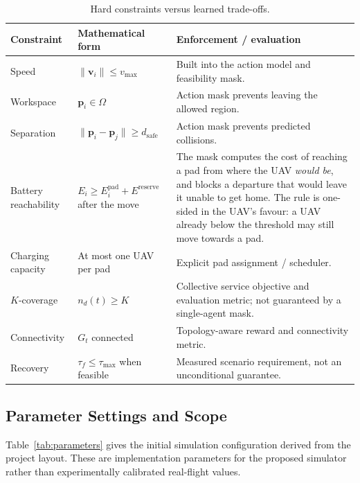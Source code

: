 \documentclass[conference]{IEEEtran}
\begin{document}
\begin{table}[t]
\caption{Hard constraints versus learned trade-offs.}
\label{tab:hardsoft}
\centering
\scriptsize
\renewcommand{\arraystretch}{1.06}
\begin{tabularx}{\columnwidth}{@{}L{1.38cm}L{2.05cm}Y@{}}
\toprule
Constraint & Mathematical form & Enforcement / evaluation \\
\midrule
Speed & $\|\mathbf v_i\|\le v_{\max}$ & Built into the action model and feasibility mask. \\
Workspace & $\mathbf p_i\in\Omega$ & Action mask prevents leaving the allowed region. \\
Separation & $\|\mathbf p_i-\mathbf p_j\|\ge d_{\mathrm{safe}}$ & Action mask prevents predicted collisions. \\
Battery reachability & $E_i\ge E_i^{\mathrm{pad}}+E^{\mathrm{reserve}}$ after the move & The mask computes the cost of reaching a pad from where the UAV \emph{would be}, and blocks a departure that would leave it unable to get home. The rule is one-sided in the UAV's favour: a UAV already below the threshold may still move towards a pad. \\
Charging capacity & At most one UAV per pad & Explicit pad assignment / scheduler. \\
$K$-coverage & $n_d(t)\ge K$ & Collective service objective and evaluation metric; not guaranteed by a single-agent mask. \\
Connectivity & $G_t$ connected & Topology-aware reward and connectivity metric. \\
Recovery & $\tau_f\le\tau_{\max}$ when feasible & Measured scenario requirement, not an unconditional guarantee. \\
\bottomrule
\end{tabularx}
\end{table}

\subsection{Parameter Settings and Scope}
\label{sec:parameters}
Table~\ref{tab:parameters} gives the initial simulation configuration derived from the project layout. These are implementation parameters for the proposed simulator rather than experimentally calibrated real-flight values.
\end{document}

